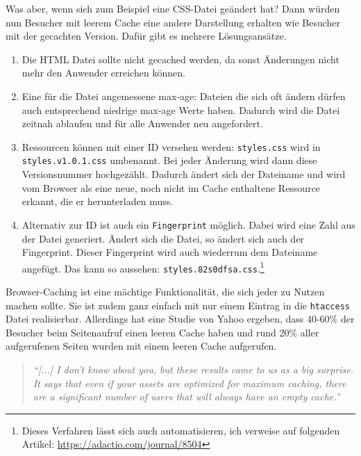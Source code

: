 			  Was aber, wenn sich zum Beispiel eine CSS-Datei geändert hat? Dann würden nun Besucher mit leerem Cache eine andere Darstellung erhalten wie Besucher mit der gecachten Version. Dafür gibt es mehrere Lösungsansätze.

			  \begin{enumerate}
			  	\item Die HTML Datei sollte nicht gecached werden, da sonst Änderungen nicht mehr den Anwender erreichen können.

			  	\item Eine für die Datei angemessene max-age: Dateien die sich oft ändern dürfen auch entsprechend niedrige max-age Werte haben. Dadurch wird die Datei zeitnah ablaufen und für alle Anwender neu angefordert.

			  	\item Ressourcen können mit einer ID versehen werden: \texttt{styles.css} wird in \texttt{styles.v1.0.1.css} umbenannt. Bei jeder Änderung wird dann diese Versionsnummer hochgezählt. Dadurch ändert sich der Dateiname und wird vom Browser als eine neue, noch nicht im Cache enthaltene Ressource erkannt, die er herunterladen muss.

			  	\item Alternativ zur ID ist auch ein \texttt{Fingerprint} möglich. Dabei wird eine Zahl aus der Datei generiert. Ändert sich die Datei, so ändert sich auch der Fingerprint. Dieser Fingerprint wird auch wiederrum dem Dateiname angefügt. Das kann so aussehen: \texttt{styles.82s0dfsa.css}.\footnote{Dieses Verfahren lässt sich auch automatisieren, ich verweise auf folgenden Artikel: \url{https://adactio.com/journal/8504}}
			  \end{enumerate}

			  Browser-Caching ist eine mächtige Funktionalität, die sich jeder zu Nutzen machen sollte. Sie ist zudem ganz einfach mit nur einem Eintrag in die \texttt{htaccess} Datei realisierbar. Allerdings hat eine Studie von Yahoo ergeben, dass 40-60\% der Besucher beim Seitenaufruf einen leeren Cache haben und rund 20\% aller aufgerufenen Seiten wurden mit einem leeren Cache aufgerufen.
				\begin{quote}
					\textit{"`[...] I don't know about you, but these results came to us as a big surprise. It says that even if your assets are optimized for maximum caching, there are a significant number of users that will always have an empty cache."'\autocite{yahoo07}}
				\end{quote}

